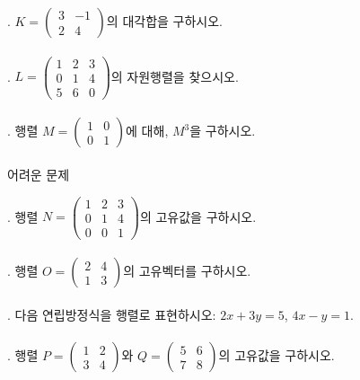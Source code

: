 \documentclass[fleqn]{article}
\begin{document}
. \( K = \begin{pmatrix} 3 & -1 \\ 2 & 4 \end{pmatrix} \)의 대각합을 구하시오. \\\\
  
. \( L = \begin{pmatrix} 1 & 2 & 3 \\ 0 & 1 & 4 \\ 5 & 6 & 0 \end{pmatrix} \)의 자원행렬을 찾으시오. \\\\
  
. 행렬 \( M = \begin{pmatrix} 1 & 0 \\ 0 & 1 \end{pmatrix} \)에 대해, \( M^3 \)을 구하시오. \\\\

 어려운 문제

. 행렬 \( N = \begin{pmatrix} 1 & 2 & 3 \\ 0 & 1 & 4 \\ 0 & 0 & 1 \end{pmatrix} \)의 고유값을 구하시오. \\\\
  
. 행렬 \( O = \begin{pmatrix} 2 & 4 \\ 1 & 3 \end{pmatrix} \)의 고유벡터를 구하시오. \\\\
  
. 다음 연립방정식을 행렬로 표현하시오: \( 2x + 3y = 5 \), \( 4x - y = 1 \). \\\\
  
. 행렬 \( P = \begin{pmatrix} 1 & 2 \\ 3 & 4 \end{pmatrix} \)와 \( Q = \begin{pmatrix} 5 & 6 \\ 7 & 8 \end{pmatrix} \)의 고유값을 구하시오. \\\\
  
\end{document}
